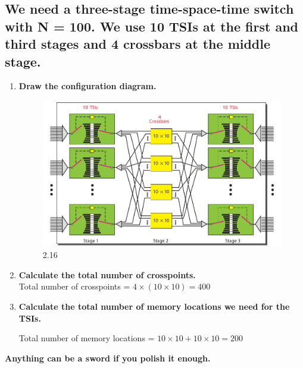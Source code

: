 \documentclass{article}
\begin{document}
\subsection{We need a three-stage time-space-time switch with N = 100. We use 10 TSIs
	at the first and third stages and 4 crossbars at the middle stage.}
\begin{enumerate}
	\item \textbf{ Draw the configuration diagram. }
	      \begin{figure}[H]
		      \center
		      \includegraphics[scale=0.5]{8.4.png}
		      \caption{2.16}
	      \end{figure}
	\item \textbf{ Calculate the total number of crosspoints. } \\
	      Total number of crosspoints = $ 4 \times (10 \times 10) = 400 $
	\item \textbf{ Calculate the total number of memory locations we need for the TSIs. } \par
	      Total number of memory locations = $ 10 \times 10 + 10 \times 10 = 200 $
\end{enumerate}

\vspace{7.5cm}
\textbf{
	Anything can be a sword if you polish it enough.
}
\end{document}

